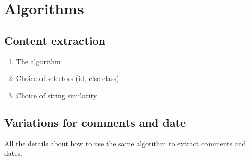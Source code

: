 \section{Algorithms}

\subsection{Content extraction}
\begin{enumerate}
  \item The algorithm
  \item Choice of selectors (id, else class)
  \item Choice of string similarity
\end{enumerate}

\subsection{Variations for comments and date}
All the details about how to use the same algorithm to extract comments and dates.
